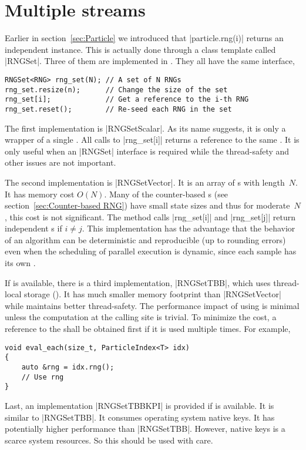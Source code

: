 \section{Multiple \texorpdfstring{\rng}{RNG} streams}
\label{sec:Multiple RNG streams}

Earlier in section~\ref{sec:Particle} we introduced that |particle.rng(i)|
returns an independent \rng instance. This is actually done through a class
template called |RNGSet|. Three of them are implemented in \mckl. They all have
the same interface,
\begin{verbatim}
RNGSet<RNG> rng_set(N); // A set of N RNGs
rng_set.resize(n);      // Change the size of the set
rng_set[i];             // Get a reference to the i-th RNG
rng_set.reset();        // Re-seed each RNG in the set
\end{verbatim}
The first implementation is |RNGSetScalar|. As its name suggests, it is only a
wrapper of a single \rng. All calls to |rng_set[i]| returns a reference to the
same \rng. It is only useful when an |RNGSet| interface is required while the
thread-safety and other issues are not important.

The second implementation is |RNGSetVector|. It is an array of \rng{}s with
length~$N$. It has memory cost $O(N)$. Many of the counter-based \rng{}s (see
section~\ref{sec:Counter-based RNG}) have small state sizes and thus for
moderate~$N$, this cost is not significant. The method calls |rng_set[i]| and
|rng_set[j]| return independent \rng{}s if $i \ne j$. This implementation has
the advantage that the behavior of an algorithm can be deterministic and
reproducible (up to rounding errors) even when the scheduling of parallel
execution is dynamic, since each sample has its own \rng.

If \tbb is available, there is a third implementation, |RNGSetTBB|, which
uses thread-local storage (\tls). It has much smaller memory footprint than
|RNGSetVector| while maintains better thread-safety. The performance impact of
using \tls is minimal unless the computation at the calling site is trivial. To
minimize the \tls cost, a reference to the \rng shall be obtained first if it
is used multiple times. For example,
\begin{verbatim}
void eval_each(size_t, ParticleIndex<T> idx)
{
    auto &rng = idx.rng();
    // Use rng
}
\end{verbatim}

Last, an implementation |RNGSetTBBKPI| is provided if \tbb is available. It is
similar to |RNGSetTBB|. It consumes operating system native \tls keys. It has
potentially higher performance than |RNGSetTBB|. However, native \tls keys is a
scarce system resources. So this should be used with care.

